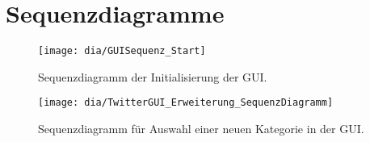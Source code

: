\section{Sequenzdiagramme}
\begin{figure}[h!]
	\centering
	\texttt{[image: dia/GUISequenz\_Start]}
	\caption{Sequenzdiagramm der Initialisierung der GUI.}
	\label{fig:GUIStartSeq}
\end{figure}
\begin{figure}[h!]
	\centering
	\texttt{[image: dia/TwitterGUI\_Erweiterung\_SequenzDiagramm]}
	\caption{Sequenzdiagramm für Auswahl einer neuen Kategorie in der GUI.}
	\label{fig:GUISeq}
\end{figure}
